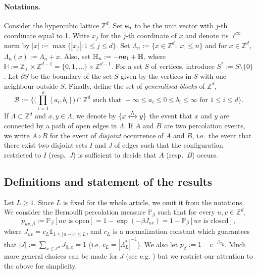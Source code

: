 \documentclass[11pt,a4paper]{article}
\numberwithin{equation}{section}
\theoremstyle{plain}
\theoremstyle{definition}
\newcommand{\connect}{\xleftrightarrow}
\begin{document}
\paragraph{Notations.} Consider the hypercubic lattice $\mathbb Z^d$.
Set  ${\bf e}_j$ to be the unit vector with $j$-th coordinate equal to 1. Write $x_j$ for the $j$-th coordinate of $x$ and denote its $\ell^\infty$ norm by $|x|:=\max\{|x_j|:1\le j\le d\}$. Set $\Lambda_n:=\{x\in \mathbb Z^d:|x|\le n\}$ and for $x\in \mathbb Z^d$, $\Lambda_n(x):=\Lambda_n+x$. Also, set $\mathbb H_n:=-n{\bf e}_1+\mathbb H$, where $\mathbb H:=\mathbb Z_+\times\mathbb Z^{d-1}=\{0,1,\ldots\}\times \mathbb Z^{d-1}$. For a set $S$ of vertices, introduce $S^*:=S\setminus\{0\}$. Let $\partial S$ be the boundary of the set $S$ given by the vertices in $S$ with one neighbour outside $S$. Finally, define the set of \emph{generalised blocks} of $\mathbb Z^d$, 
\begin{equation}
\mathcal B:=\Big\{\Big(\prod_{i=1}^d[a_i, b_i]\Big)\cap \mathbb Z^d
\text{ such that }-\infty\le a_i\le 0\le b_i\le\infty\text{ for }1\le i\le d\Big\}.
\end{equation}
If $\Lambda\subset \mathbb Z^d$ and $x,y\in \Lambda$, we denote by $\{x\connect{\Lambda\:}y\}$ the event that $x$ and $y$ are connected by a path of open edges in $\Lambda$.
If $A$ and $B$ are two percolation events, we write $A\circ B$ for the event of \emph{disjoint} occurrence of $A$ and $B$, i.e.~the event that there exist two disjoint sets $I$ and $J$ of edges such that the configuration restricted to $I$ (resp.~$J$) is sufficient to decide that $A$ (resp.~$B$) occurs. 

\subsection{Definitions and statement of the results}
 Let $L\geq 1$. Since $L$ is fixed for the whole article, we omit it from the notations. We consider the Bernoulli percolation measure $\mathbb P_\beta$ such that for every $u,v\in \mathbb Z^d$,
 \begin{equation}
 	p_{uv,\beta}:=\mathbb P_\beta[uv\text{ is open}]=1-\exp(-\beta J_{uv})=1-\mathbb P_\beta[uv\text{ is closed}],
 \end{equation} 
 where $J_{uv}=c_L\mathds{1}_{1\leq |u-v|\leq L}$, and $c_L$ is a normalization constant which guarantees that $|J|:=\sum_{x\in \mathbb Z^d}J_{0,x}=1$ (i.e. $c_L=|\Lambda_L^*|^{-1}$). We also let $p_\beta:=1-e^{-\beta c_L}$. Much more general choices can be made for $J$ (see e.g. \cite{HaraSlade1990Perco,vdHofstafdSlade2002generalisedinductive,HaraSladevdHofstad2003PercoSO}) but we restrict our attention to the above for simplicity.
 
\end{document}
